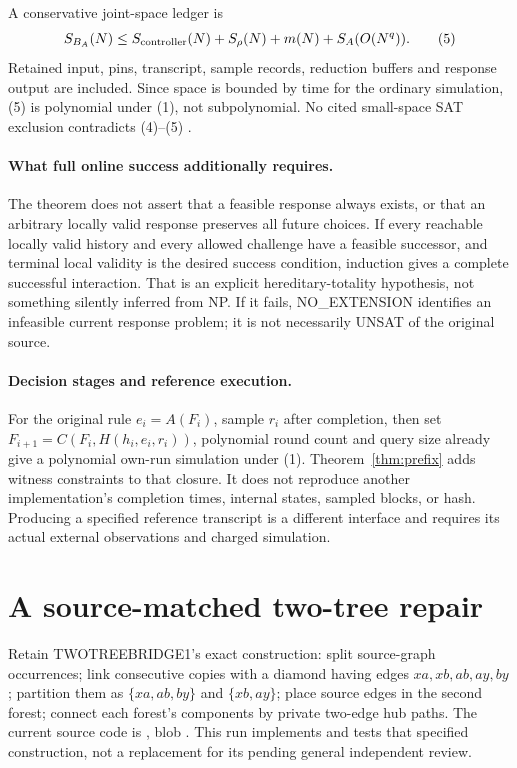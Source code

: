 \documentclass[11pt]{article}
\begin{document}
A conservative joint-space ledger is
\[
 S_{B_A}(N)\le S_{\rm controller}(N)+S_\rho(N)+m(N)
                        +S_A(O(N^q)).                  \tag{5}
\]
Retained input, pins, transcript, sample records, reduction buffers and
response output are included. Since space is bounded by time for the
ordinary simulation, (5) is polynomial under (1), not subpolynomial.
No cited small-space SAT exclusion contradicts (4)--(5) \cite{mw}.

\paragraph{What full online success additionally requires.}
The theorem does not assert that a feasible response always exists, or that
an arbitrary locally valid response preserves all future choices. If every
reachable locally valid history and every allowed challenge have a feasible
successor, and terminal local validity is the desired success condition,
induction gives a complete successful interaction. That is an explicit
hereditary-totality hypothesis, not something silently inferred from NP.
If it fails, NO\_EXTENSION identifies an infeasible current response problem;
it is not necessarily UNSAT of the original source.

\paragraph{Decision stages and reference execution.}
For the original rule $e_i=A(F_i)$, sample $r_i$ after completion, then set
$F_{i+1}=C(F_i,H(h_i,e_i,r_i))$, polynomial round count and query size already
give a polynomial own-run simulation under (1). Theorem~\ref{thm:prefix}
adds witness constraints to that closure. It does not reproduce another
implementation's completion times, internal states, sampled blocks, or hash.
Producing a specified reference transcript is a different interface and
requires its actual external observations and charged simulation.

\section{A source-matched two-tree repair}
Retain TWOTREEBRIDGE1's exact construction: split source-graph occurrences;
link consecutive copies with a diamond having edges $xa,xb,ab,ay,by$;
partition them as $\{xa,ab,by\}$ and $\{xb,ay\}$; place source edges in the
second forest; connect each forest's components by private two-edge hub paths.
The current source code is
, blob
.
This run implements and tests that specified construction, not a replacement
for its pending general independent review.
\end{document}
